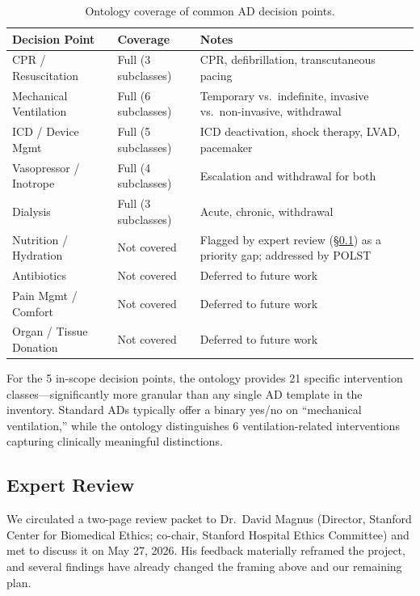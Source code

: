 \documentclass[11pt]{article}
\begin{document}
\begin{table}[ht]
\centering
\caption{Ontology coverage of common AD decision points.}
\label{tab:coverage}
\small
\begin{tabular}{L{3.5cm} L{3cm} L{7cm}}
\toprule
\textbf{Decision Point} & \textbf{Coverage} & \textbf{Notes} \\
\midrule
CPR / Resuscitation & Full (3 subclasses) & CPR, defibrillation, transcutaneous pacing \\
Mechanical Ventilation & Full (6 subclasses) & Temporary vs.\ indefinite, invasive vs.\ non-invasive, withdrawal \\
ICD / Device Mgmt & Full (5 subclasses) & ICD deactivation, shock therapy, LVAD, pacemaker \\
Vasopressor / Inotrope & Full (4 subclasses) & Escalation and withdrawal for both \\
Dialysis & Full (3 subclasses) & Acute, chronic, withdrawal \\
\midrule
Nutrition / Hydration & Not covered & Flagged by expert review (\S\ref{sec:expert}) as a priority gap; addressed by POLST \\
Antibiotics & Not covered & Deferred to future work \\
Pain Mgmt / Comfort & Not covered & Deferred to future work \\
Organ / Tissue Donation & Not covered & Deferred to future work \\
\bottomrule
\end{tabular}
\end{table}

For the 5 in-scope decision points, the ontology provides 21 specific intervention classes---significantly more granular than any single AD template in the inventory. Standard ADs typically offer a binary yes/no on ``mechanical ventilation,'' while the ontology distinguishes 6 ventilation-related interventions capturing clinically meaningful distinctions.

\subsection{Expert Review}
\label{sec:expert}

We circulated a two-page review packet to Dr.\ David Magnus (Director, Stanford Center for Biomedical Ethics; co-chair, Stanford Hospital Ethics Committee) and met to discuss it on May 27, 2026. His feedback materially reframed the project, and several findings have already changed the framing above and our remaining plan.
\end{document}
